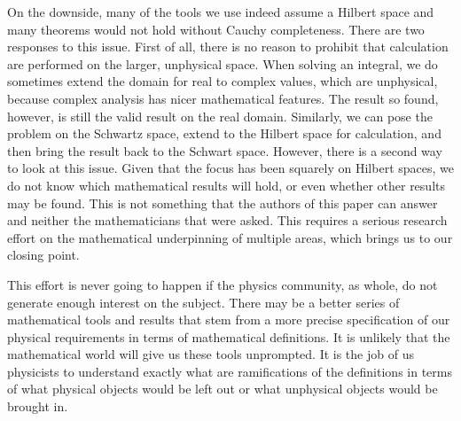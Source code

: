 \documentclass[10pt,twocolumn, nofootinbib]{revtex4-2}
\begin{document}
On the downside, many of the tools we use indeed assume a Hilbert space and many theorems would not hold without Cauchy completeness. There are two responses to this issue. First of all, there is no reason to prohibit that calculation are performed on the larger, unphysical space. When solving an integral, we do sometimes extend the domain for real to complex values, which are unphysical, because complex analysis has nicer mathematical features. The result so found, however, is still the valid result on the real domain. Similarly, we can pose the problem on the Schwartz space, extend to the Hilbert space for calculation, and then bring the result back to the Schwart space. However, there is a second way to look at this issue. Given that the focus has been squarely on Hilbert spaces, we do not know which mathematical results will hold, or even whether other results may be found. This is not something that the authors of this paper can answer and neither the mathematicians that were asked. This requires a serious research effort on the mathematical underpinning of multiple areas, which brings us to our closing point.

This effort is never going to happen if the physics community, as whole, do not generate enough interest on the subject. There may be a better series of mathematical tools and results that stem from a more precise specification of our physical requirements in terms of mathematical definitions. It is unlikely that the mathematical world will give us these tools unprompted. It is the job of us physicists to understand exactly what are ramifications of the definitions in terms of what physical objects would be left out or what unphysical objects would be brought in.

\end{document}
